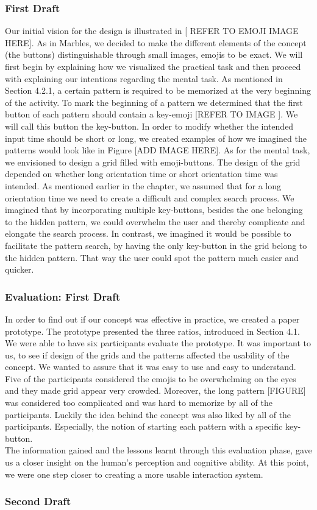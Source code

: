 \subsubsection{First Draft}
Our initial vision for the design is illustrated in [ REFER TO EMOJI IMAGE HERE]. As in Marbles, we decided to make the different elements of the concept (the buttons) distinguishable through small images, emojis to be exact. We will first begin by explaining how we visualized the practical task and then proceed with explaining our intentions regarding the mental task. As mentioned in Section 4.2.1, a certain pattern is required to be memorized at the very beginning of the activity. To mark the beginning of a pattern we determined that the first button of each pattern should contain a key-emoji [REFER TO IMAGE ]. We will call this button the key-button. In order to modify whether the intended input time should be short or long, we created examples of how we imagined the patterns would look like in Figure [ADD IMAGE HERE]. As for the mental task, we envisioned to design a grid filled with emoji-buttons. The design of the grid depended on whether long orientation time or short orientation time was intended. As mentioned earlier in the chapter, we assumed that for a long orientation time we need to create a difficult and complex search process. We imagined that by incorporating multiple key-buttons, besides the one belonging to the hidden pattern, we could overwhelm the user and thereby complicate and elongate the search process. In contrast, we imagined it would be possible to facilitate the pattern search, by having the only key-button in the grid belong to the hidden pattern. That way the user could spot the pattern much easier and quicker.

\subsubsection{Evaluation: First Draft}
In order to find out if our concept was effective in practice, we created a paper prototype. The prototype presented the three ratios, introduced in Section 4.1. We were able to have six participants evaluate the prototype. It was important to us, to see if design of the grids and the patterns affected the usability of the concept. We wanted to assure that it was easy to use and easy to understand.
Five of the participants considered the emojis to be overwhelming on the eyes and they made grid appear very crowded. Moreover, the long pattern [FIGURE] was considered too complicated and was hard to memorize by all of the participants. 
Luckily the idea behind the concept was also liked by all of the participants. Especially, the notion of starting each pattern with a specific key-button. \\

The information gained and the lessons learnt through this evaluation phase, gave us a closer insight on the human's perception and cognitive ability. At this point, we were one step closer to creating a more usable interaction system. 

\subsubsection{Second Draft}
